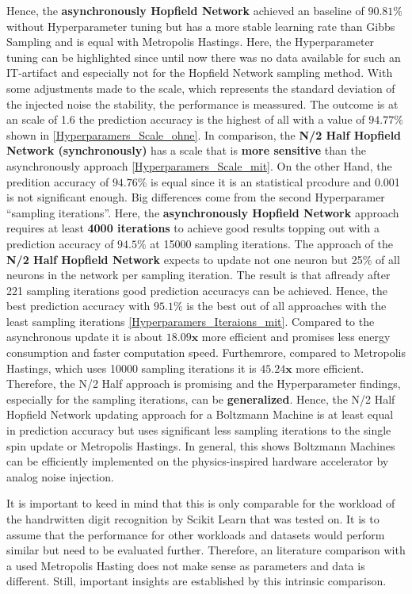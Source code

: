 Hence, the \textbf{asynchronously Hopfield Network} achieved an baseline of \(\mathbf{90.81\%}\) without Hyperparameter tuning but has a more stable  learning rate than Gibbs Sampling and
is equal with Metropolis Hastings.
Here, the Hyperparameter tuning can be highlighted since until now there was no data available for such an \ac{IT}-artifact and especially not for the Hopfield Network sampling method.
With some adjustments made to the scale, which represents the standard deviation of the injected noise the stability, the performance is meassured.
The outcome is at an scale of 1.6 the prediction accuracy is the highest of all with a value of \(\mathbf{94.77\%}\) shown in \ref{Hyperparamers_Scale_ohne}.
In comparison, the \textbf{N/2 Half Hopfield Network (synchronously)} has a scale that is \textbf{ more sensitive} than the asynchronously approach \ref{Hyperparamers_Scale_mit}.
On the other Hand, the predition accuracy of \(\mathbf{94.76\%}\) is equal since it is an statistical prcodure and 0.001 is not significant enough.
Big differences come from the second Hyperparamer ``sampling iterations''. 
Here, the \textbf{asynchronously Hopfield Network} approach requires at least \textbf{4000 iterations} to achieve good results topping out with
a prediction accuracy of \(\mathbf{94.5\%}\) at 15000 sampling iterations. The approach of the
\textbf{N/2 Half Hopfield Network} expects to update not one neuron but 25\% of all neurons in the network per sampling iteration. 
The result is that aflready after 221 sampling iterations good prediction accuracys can be achieved.
Hence, the best prediction accuracy with \(\mathbf{95.1\%}\) is the best out of all approaches with the least sampling iterations \ref{Hyperparamers_Iteraions_mit}.
Compared to the asynchronous update it is about \(\mathbf{18.09x}\) more efficient and promises less energy consumption and faster computation speed. 
Furthemrore, compared to Metropolis Hastings, which uses 10000 sampling iterations it is \(\mathbf{45.24x}\) more efficient.
Therefore, the N/2 Half approach is promising and the Hyperparameter findings, especially for the sampling iterations, can be \textbf{generalized}.
Hence, the N/2 Half Hopfield Network updating approach for a Boltzmann Machine is at least equal in prediction accuracy but uses significant less sampling iterations to the single spin update or Metropolis Hastings.
In general, this shows Boltzmann Machines can be efficiently implemented on the physics-inspired hardware accelerator by analog noise injection. 

It is important to keed in mind that this is only comparable for the workload of the handrwitten digit recognition by Scikit Learn that was tested on. 
It is to assume that the performance for other workloads and datasets would perform similar but need to be evaluated further. 
Therefore, an literature comparison with a used Metropolis Hasting does not make sense as parameters and data is different. 
Still, important insights are established by this intrinsic comparison. 

